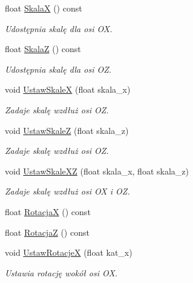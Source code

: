 \begin{DoxyCompactItemize}
float \hyperlink{class_pz_g_1_1_lacze_do_g_n_u_plota_a76f367ee032ec1aaa610ee6f6dc49b67}{Skala\+X} () const 
\begin{DoxyCompactList}\small\item\em Udostępnia skalę dla osi {\itshape O\+X}. \end{DoxyCompactList}\item 
float \hyperlink{class_pz_g_1_1_lacze_do_g_n_u_plota_a2b34c26dc7193546666cf15e74d29209}{Skala\+Z} () const 
\begin{DoxyCompactList}\small\item\em Udostępnia skalę dla osi {\itshape O\+Z}. \end{DoxyCompactList}\item 
void \hyperlink{class_pz_g_1_1_lacze_do_g_n_u_plota_a855b8338bfe3e5d294d719f24b11090e}{Ustaw\+Skale\+X} (float skala\+\_\+x)
\begin{DoxyCompactList}\small\item\em Zadaje skalę wzdłuż osi {\itshape O\+Z}. \end{DoxyCompactList}\item 
void \hyperlink{class_pz_g_1_1_lacze_do_g_n_u_plota_ab0486db3166d8db6580a221079af241f}{Ustaw\+Skale\+Z} (float skala\+\_\+z)
\begin{DoxyCompactList}\small\item\em Zadaje skalę wzdłuż osi {\itshape O\+Z}. \end{DoxyCompactList}\item 
void \hyperlink{class_pz_g_1_1_lacze_do_g_n_u_plota_a4308151b54e105d302803146a3238699}{Ustaw\+Skale\+X\+Z} (float skala\+\_\+x, float skala\+\_\+z)
\begin{DoxyCompactList}\small\item\em Zadaje skalę wzdłuż osi {\itshape O\+X} i {\itshape O\+Z}. \end{DoxyCompactList}\item 
float \hyperlink{class_pz_g_1_1_lacze_do_g_n_u_plota_af6fc8ea5b068e5fa099f13f40821fe36}{Rotacja\+X} () const 
\item 
float \hyperlink{class_pz_g_1_1_lacze_do_g_n_u_plota_a6b89a8300be0c17a6f9f9bf8bc8934cb}{Rotacja\+Z} () const 
\item 
void \hyperlink{class_pz_g_1_1_lacze_do_g_n_u_plota_a88324c53a70846fb6bc9d918ce21fd56}{Ustaw\+Rotacje\+X} (float kat\+\_\+x)
\begin{DoxyCompactList}\small\item\em Ustawia rotację wokół osi {\itshape O\+X}. \end{DoxyCompactList}\item 

\end{DoxyCompactItemize}
